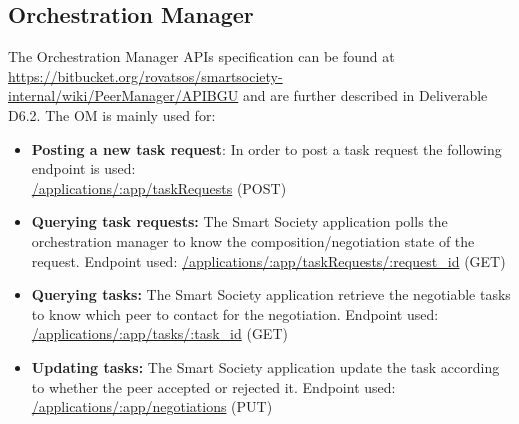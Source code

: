 \subsection{Orchestration Manager}
The Orchestration Manager APIs specification can be found at \url{https://bitbucket.org/rovatsos/smartsociety-internal/wiki/PeerManager/APIBGU} and are further described in Deliverable D6.2. The OM is mainly used for:
\begin{itemize}
\item {\bf Posting a new task request}: In order to post a task request the following endpoint is used:\\
	\url{/applications/:app/taskRequests} (\textsc{POST})
\item {\bf Querying task requests:} The Smart Society application polls the orchestration manager to know the composition/negotiation state of the request. Endpoint used:
  \url{/applications/:app/taskRequests/:request_id} (\textsc{GET})
\item {\bf Querying tasks:} The Smart Society application retrieve the negotiable tasks to know which peer to contact for the negotiation. Endpoint used:
  \url{/applications/:app/tasks/:task_id} (\textsc{GET})
\item {\bf Updating tasks:} The Smart Society application update the task according to whether the peer accepted or rejected it. Endpoint used:
  \url{/applications/:app/negotiations} (\textsc{PUT})
\end{itemize}
